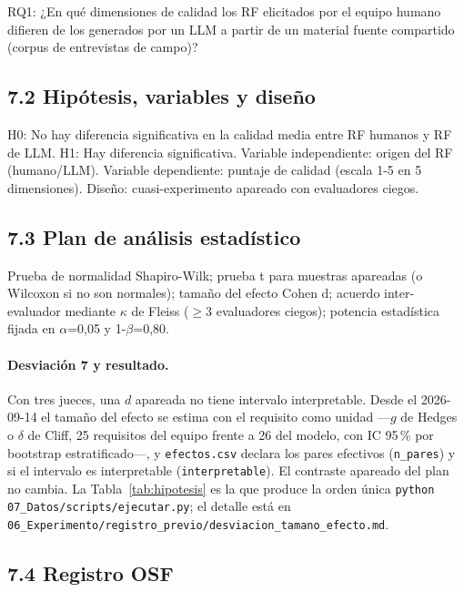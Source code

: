 RQ1: ¿En qué dimensiones de calidad los RF elicitados por el equipo humano difieren de los generados por un LLM a partir de un material fuente compartido (corpus de entrevistas de campo)?


\subsection*{7.2 Hipótesis, variables y diseño}


H0: No hay diferencia significativa en la calidad media entre RF humanos y RF de LLM. H1: Hay diferencia significativa. Variable independiente: origen del RF (humano/LLM). Variable dependiente: puntaje de calidad (escala 1-5 en 5 dimensiones). Diseño: cuasi-experimento apareado con evaluadores ciegos.


\subsection*{7.3 Plan de análisis estadístico}


Prueba de normalidad Shapiro-Wilk; prueba t para muestras apareadas (o Wilcoxon si no son normales); tamaño del efecto Cohen d; acuerdo inter-evaluador mediante $\kappa$ de Fleiss ($\geq$3 evaluadores ciegos); potencia estadística fijada en $\alpha$=0,05 y 1-$\beta$=0,80.

\paragraph{Desviación 7 y resultado.} Con tres jueces, una $d$ apareada no tiene intervalo interpretable. Desde el 2026-09-14 el tamaño del efecto se estima con el requisito como unidad ---$g$ de Hedges o $\delta$ de Cliff, 25 requisitos del equipo frente a 26 del modelo, con IC 95\,\% por bootstrap estratificado---, y \texttt{efectos.csv} declara los pares efectivos (\texttt{n\_pares}) y si el intervalo es interpretable (\texttt{interpretable}). El contraste apareado del plan no cambia. La Tabla~\ref{tab:hipotesis} es la que produce la orden única \texttt{python 07\_Datos/scripts/ejecutar.py}; el detalle está en \texttt{06\_Experimento/registro\_previo/desviacion\_tamano\_efecto.md}.




\subsection*{7.4 Registro OSF}

